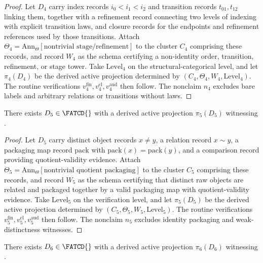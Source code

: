 \begin{proof}
Let \(D_4\) carry index records \(i_0 < i_1 < i_2\) and transition
records \(t_{01}, t_{12}\) linking them, together with a refinement
record connecting two levels of indexing with explicit transition laws,
and closure records for the endpoints and refinement references used by
those transitions. Attach
\(\Theta_4 = \mathrm{Ann}_\Theta[\text{nontrivial stage/refinement}]\)
to the cluster \(C_4\) comprising these records, and record \(W_4\) as
the schema certifying a non-identity
order, transition, refinement, or stage tower. Take
\(\mathrm{Level}_4\) on the structural-categorical level, and let
\(\pi_4(D_4)\) be the derived active projection determined by
\((C_4,\Theta_4,W_4,\mathrm{Level}_4)\). The routine verifications
\(v_4^{\mathrm{fin}}, v_4^{\mathrm{cl}}, v_4^{\mathrm{aud}}\) then
follow. The nonclaim \(n_4\) excludes bare labels and arbitrary
relations or transitions without laws.
\end{proof}

\begin{proposition}\label{prop:p5-witness}
There exists \(D_5 \in \FATCD{}\) with a derived active projection
\(\pi_5(D_5)\) witnessing \Pfive{}.
\end{proposition}

\begin{proof}
Let \(D_5\) carry distinct object records \(x \ne y\), a relation
record \(x \sim y\), a packaging map record
\(\mathrm{pack}\) with \(\mathrm{pack}(x) = \mathrm{pack}(y)\), and a
comparison record providing quotient-validity evidence. Attach
\(\Theta_5 = \mathrm{Ann}_\Theta[\text{nontrivial quotient packaging}]\)
to the cluster \(C_5\) comprising these records, and record \(W_5\) as
the schema certifying
that distinct raw objects are related and packaged together by a valid
packaging map with quotient-validity evidence. Take
\(\mathrm{Level}_5\) on the verification level, and let \(\pi_5(D_5)\)
be the derived active projection determined by
\((C_5,\Theta_5,W_5,\mathrm{Level}_5)\). The routine verifications
\(v_5^{\mathrm{fin}}, v_5^{\mathrm{cl}}, v_5^{\mathrm{aud}}\) then
follow. The nonclaim \(n_5\) excludes identity packaging and
weak-distinctness witnesses.
\end{proof}

\begin{proposition}\label{prop:p6-witness}
There exists \(D_6 \in \FATCD{}\) with a derived active projection
\(\pi_6(D_6)\) witnessing \Psix{}.
\end{proposition}

